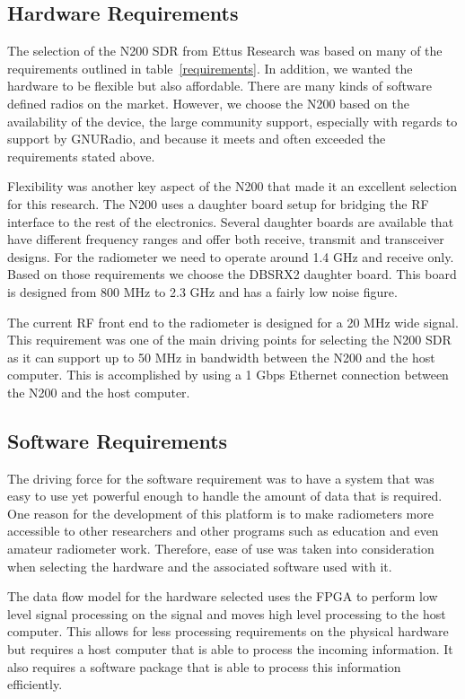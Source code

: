 \subsection{Hardware Requirements}

The selection of the N200 SDR from Ettus Research was based on many of the requirements outlined in table~\ref{requirements}.  In addition, we wanted the hardware to be flexible but also affordable.  There are many kinds of software defined radios on the market.  However, we choose the N200 based on the availability of the device, the large community support, especially with regards to support by GNURadio, and because it meets and often exceeded the requirements stated above.  

Flexibility was another key aspect of the N200 that made it an excellent selection for this research.  The N200 uses a daughter board setup for bridging the RF interface to the rest of the electronics.  Several daughter boards are available that have different frequency ranges and offer both receive, transmit and transceiver designs.  For the radiometer we need to operate around 1.4 GHz and receive only.  Based on those requirements we choose the DBSRX2 daughter board.  This board is designed from 800 MHz to 2.3 GHz and has a fairly low noise figure.

The current RF front end to the radiometer is designed for a 20 MHz wide signal.  This requirement was one of the main driving points for selecting the N200 SDR as it can support up to 50 MHz in bandwidth between the N200 and the host computer.  This is accomplished by using a 1 Gbps Ethernet connection between the N200 and the host computer.

\subsection{Software Requirements}

The driving force for the software requirement was to have a system that was easy to use yet powerful enough to handle the amount of data that is required.  One reason for the development of this platform is to make radiometers more accessible to other researchers and other programs such as education and even amateur radiometer work.  Therefore, ease of use was taken into consideration when selecting the hardware and the associated software used with it.

The data flow model for the hardware selected uses the FPGA to perform low level signal processing on the signal and moves high level processing to the host computer.  This allows for less processing requirements on the physical hardware but requires a host computer that is able to process the incoming information.  It also requires a software package that is able to process this information efficiently. 

